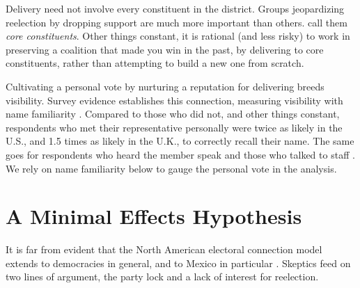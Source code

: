 \documentclass[letter,12pt]{article}
\begin{document}

Delivery need not involve every constituent in the district. Groups jeopardizing reelection by dropping support are much more important than others. \citet{cox.mccubbins.1986} call them \emph{core constituents}. Other things constant, it is rational (and less risky) to work in preserving a coalition that made you win in the past, by delivering to core constituents, rather than attempting to build a new one from scratch.

Cultivating a personal vote by nurturing a reputation for delivering breeds visibility. Survey evidence establishes this connection, measuring visibility with name familiarity \citep{abramowitz1975name-familiarity}. Compared to those who did not, and other things constant, respondents who met their representative personally were twice as likely in the U.S., and 1.5 times as likely in the U.K., to correctly recall their name. The same goes for respondents who heard the member speak and those who talked to staff \citep[][:34]{cain.etal.1987}. We rely on name familiarity below to gauge the personal vote in the analysis. 



\section{A Minimal Effects Hypothesis}

It is far from evident that the North American electoral connection model extends to democracies in general, and to Mexico in particular \citep{samuels.2003,jones.etal.amateurLegis.2002}. Skeptics feed on two lines of argument, the party lock and a lack of interest for reelection.
\end{document}
